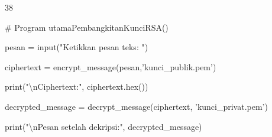 \documentclass{article}
\begin{document}

38

\# Program utamaPembangkitanKunciRSA()

pesan = input("Ketikkan pesan teks: ")

ciphertext = encrypt\_message(pesan,'kunci\_publik.pem’)

print("\textbackslash{}nCiphertext:", ciphertext.hex())

decrypted\_message = decrypt\_message(ciphertext, 'kunci\_privat.pem’)

print("\textbackslash{}nPesan setelah dekripsi:", decrypted\_message)
\end{document}
